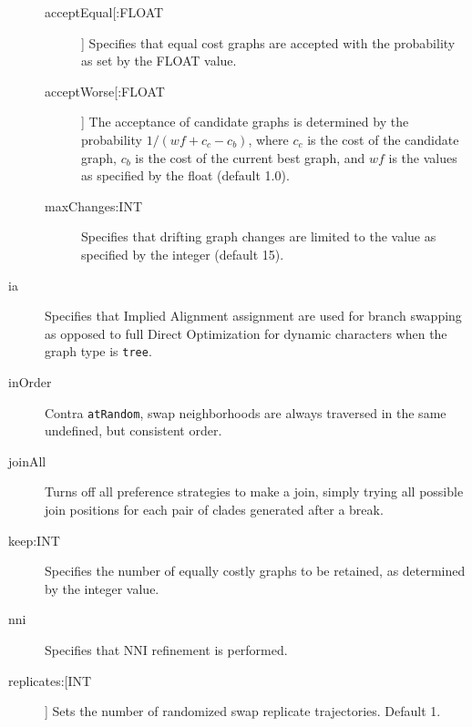 \begin{description}
		\begin{description}
			
			\item[acceptEqual[:FLOAT]] Specifies that equal cost graphs are accepted with the
			probability as set by the FLOAT value. 
			
			\item[acceptWorse[:FLOAT]] The acceptance of candidate graphs is determined by the 
			probability $1/ (wf + c_c - c_b)$, where $c_c$ is the cost of the candidate graph, $c_b$ 
			is the cost of the current best graph, and $wf$ is the values as specified by the float 
			(default 1.0). 	
			
			\item[maxChanges:INT] Specifies that drifting graph changes are limited to the 
			value as specified by the integer (default 15).
			
		\end{description}
		
		\item[ia] Specifies that Implied Alignment \citep{Wheeler2003} assignment are used for 
		branch swapping as opposed to full Direct Optimization for dynamic characters when the 
		graph type is \texttt{tree}.
		
		\item[inOrder] Contra \texttt{atRandom}, swap neighborhoods are always traversed 
		in the same undefined, but consistent order.
		
		\item[joinAll] Turns off all preference strategies to make a join, simply trying all possible 
		join positions for each pair of clades generated after a break. 

		
				
		\item[keep:INT] Specifies the number of equally costly graphs to be retained, as
		determined by the integer value.		
		
		\item[nni] Specifies that NNI refinement \citep{CaminandSokal1965, Robinson1971} 
		is performed.
		
		\item[replicates:[INT]] Sets the number of randomized swap replicate trajectories. 
		Default 1.
		

\end{description}
